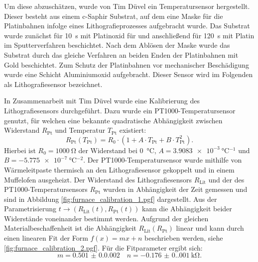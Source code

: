 Um diese abzuschätzen, wurde von Tim Düvel ein Temperatursensor hergestellt.
Dieser besteht aus einem c-Saphir Substrat, auf dem eine Maske für die Platinbahnen infolge eines
Lithografieprozesses aufgebracht wurde.
Das Substrat wurde zunächst für \qty{10}{\second} mit Platinoxid für und anschließend für \qty{120}{\second} mit Platin
im Sputterverfahren beschichtet.
Nach dem Ablösen der Maske wurde das Substrat durch das gleiche Verfahren an beiden Enden der Platinbahnen mit Gold beschichtet.
Zum Schutz der Platinbahnen vor mechanischer Beschädigung wurde eine Schicht Aluminiumoxid aufgebracht.
Dieser Sensor wird im Folgenden als Lithografiesensor bezeichnet.

In Zusammenarbeit mit Tim Düvel wurde eine Kalibrierung des Lithografiesensors durchgeführt.
Dazu wurde ein PT1000-Temperatursensor genutzt, für welchen eine bekannte quadratische Abhängigkeit zwischen Widerstand
$R_{\mathrm{Pt}}$ und Temperatur $T_{\mathrm{Pt}}$ existiert\autocite{din_pt}:
\begin{equation}
    R_{\mathrm{Pt}}(T_{\mathrm{Pt}})
    =R_0 \cdot (1 + A \cdot T_{\mathrm{Pt}} + B \cdot T_{\mathrm{Pt}}^2).
    \label{eq:pt1000_calibration}
\end{equation}
Hierbei ist $R_0 = \qty{1000}{\ohm}$ der Widerstand bei \qty{0}{\degreeCelsius},
$A = \qty{3.9083e-3}{\degreeCelsius^{-1}}$ und $B = \qty{-5.775e-7}{\degreeCelsius^{-2}}$.
Der PT1000-Temperatursensor wurde mithilfe von Wärmeleitpaste thermisch an den Lithografiesensor gekoppelt und
in einem Muffelofen ausgeheizt.
Der Widerstand des Lithografiesensors $R_\mathrm{Lit}$ und der des PT1000-Temperatursensors $R_\mathrm{Pt}$
wurden in Abhängigkeit der Zeit gemessen und sind in Abbildung \cref{fig:furnace_calibration_1.pgf} dargestellt.
Aus der Parametrisierung $t \to (R_\mathrm{Lit}(t), R_\mathrm{Pt}(t))$ kann die Abhängigkeit beider Widerstände
voneinander bestimmt werden.
Aufgrund der gleichen Materialbeschaffenheit ist die Abhängigkeit $R_\mathrm{Lit}(R_\mathrm{Pt})$ linear und kann durch
einen linearen Fit der Form $f(x)=mx+n$ beschrieben werden, siehe \cref{fig:furnace_calibration_2.pgf}.
Für die Fitparameter ergibt sich:
\begin{equation*}
    m = \num{0.501(0.0002)} \quad n = \qty{-0.176(0.001)}{\kilo\ohm}.
\end{equation*}

